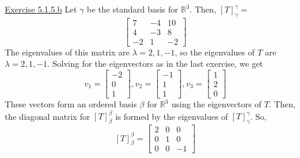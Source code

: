 \documentclass{exam}
\begin{document}
\underline{Exercise 5.1.5.b}
\newline
\newline
Let $\gamma$ be the standard basis for $\mathbb{R}^3$. Then, $[T]_\gamma^\gamma=$
\[
\begin{bmatrix}
    7 & -4 & 10 \\
    4 & -3 & 8 \\
    -2 & 1 & -2
\end{bmatrix}
\]
The eigenvalues of this matrix are $\lambda=2,1,-1$, so the eigenvalues of $T$ are $\lambda=2,1,-1$. Solving for the eigenvectors as in the last exercise, we get
\[
v_1=
\begin{bmatrix}
    -2 \\
    0 \\
    1
\end{bmatrix},
v_2=
\begin{bmatrix}
    -1 \\
    1 \\
    1
\end{bmatrix},
v_3=
\begin{bmatrix}
    1 \\
    2 \\
    0
\end{bmatrix}
\]
These vectors form an ordered basis $\beta$ for $\mathbb{R}^3$ using the eigenvectors of $T$. Then, the diagonal matrix for $[T]_\beta^\beta$ is formed by the eigenvalues of $[T]_\gamma^\gamma$. So,
\[
[T]_\beta^\beta=
\begin{bmatrix}
    2 & 0 & 0 \\
    0 & 1 & 0 \\
    0 & 0 & -1
\end{bmatrix}
\]
\end{document}
